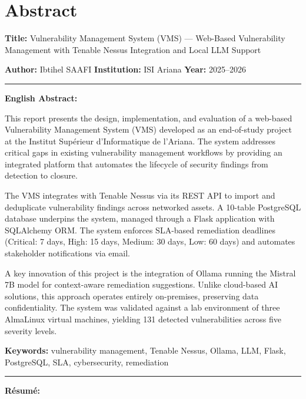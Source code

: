\chapter*{Abstract}
\thispagestyle{plain}

\textbf{Title:} Vulnerability Management System (VMS) — Web-Based Vulnerability Management with Tenable Nessus Integration and Local LLM Support

\textbf{Author:} Ibtihel SAAFI \hfill \textbf{Institution:} ISI Ariana \hfill \textbf{Year:} 2025--2026

\vspace{0.5em}
\noindent\rule{\linewidth}{0.5pt}
\vspace{0.3em}

\textbf{English Abstract:}

This report presents the design, implementation, and evaluation of a web-based Vulnerability Management System (VMS) developed as an end-of-study project at the Institut Supérieur d'Informatique de l'Ariana. The system addresses critical gaps in existing vulnerability management workflows by providing an integrated platform that automates the lifecycle of security findings from detection to closure.

The VMS integrates with Tenable Nessus via its REST API to import and deduplicate vulnerability findings across networked assets. A 10-table PostgreSQL database underpins the system, managed through a Flask application with SQLAlchemy ORM. The system enforces SLA-based remediation deadlines (Critical: 7 days, High: 15 days, Medium: 30 days, Low: 60 days) and automates stakeholder notifications via email.

A key innovation of this project is the integration of Ollama running the Mistral 7B model for context-aware remediation suggestions. Unlike cloud-based AI solutions, this approach operates entirely on-premises, preserving data confidentiality. The system was validated against a lab environment of three AlmaLinux virtual machines, yielding 131 detected vulnerabilities across five severity levels.

\textbf{Keywords:} vulnerability management, Tenable Nessus, Ollama, LLM, Flask, PostgreSQL, SLA, cybersecurity, remediation

\vspace{0.8em}
\noindent\rule{\linewidth}{0.5pt}
\vspace{0.3em}

\textbf{Résumé:}

